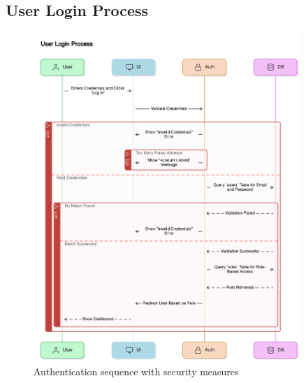 \subsection{User Login Process}
\begin{figure}[H]
    \centering
    \includegraphics[width=0.9\textwidth]{latex-doc/images/sequence_diagrams/user_login_process.png}
    \caption{Authentication sequence with security measures}
    \label{fig:user_login}
\end{figure}

